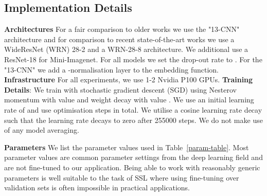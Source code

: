 \documentclass[journal]{IEEEtran}
\begin{document}
\subsection{Implementation Details } 
\textbf{Architectures} For a fair comparison to older works we use the "13-CNN" architecture \cite{tarvainen2017mean} and for comparison to recent state-of-the-art works we use a WideResNet (WRN) 28-2 and a WRN-28-8 \cite{wideresidual} architecture. We additional use a ResNet-18 \cite{wang2017residual} for Mini-Imagenet. For all models we set the drop-out rate to . For the "13-CNN" we add a -normalisation layer to the embedding function. \textbf{Infrastructure} For all experiments, we use 1-2 Nvidia P100 GPUs. \textbf{Training Details}: We train with stochastic gradient descent (SGD) using Nesterov momentum  with value  and weight decay  with value . We use an initial learning rate of  and use  optimisation steps in total. We utilise a cosine learning rate decay such that the learning rate decays to zero after 255000 steps. We do not make use of any  model averaging. 

\textbf{Parameters} We list the parameter values used in Table~\ref{param-table}. Most parameter values are common parameter settings from the deep learning field and are not fine-tuned to our application. Being able to work with reasonably generic parameters is well suitable to the task of SSL where using fine-tuning over validation sets is often impossible in practical applications.



\begin{table}[t!]
\caption{List of hyperparameters used in the paper across the CIFAR-10/100 and Mini-Imagenet datasets.}
\label{param-table}
\vskip 0.15in
\begin{center}
\end{center}
\vskip -0.1in
\end{table}
\end{document}
